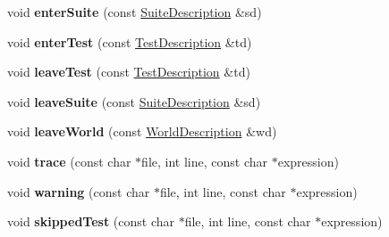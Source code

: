 \begin{DoxyCompactItemize}
\item 
\hypertarget{classCxxTest_1_1TestTracker_a777853f8a17e324fa7897bf4d7f3b105}{void {\bfseries enter\-Suite} (const \hyperlink{classCxxTest_1_1SuiteDescription}{Suite\-Description} \&sd)}\label{classCxxTest_1_1TestTracker_a777853f8a17e324fa7897bf4d7f3b105}

\item 
\hypertarget{classCxxTest_1_1TestTracker_a1bb56ae825eca66306259248716230a1}{void {\bfseries enter\-Test} (const \hyperlink{classCxxTest_1_1TestDescription}{Test\-Description} \&td)}\label{classCxxTest_1_1TestTracker_a1bb56ae825eca66306259248716230a1}

\item 
\hypertarget{classCxxTest_1_1TestTracker_ae7febc4e06e5140fac47d7ea1489ad86}{void {\bfseries leave\-Test} (const \hyperlink{classCxxTest_1_1TestDescription}{Test\-Description} \&td)}\label{classCxxTest_1_1TestTracker_ae7febc4e06e5140fac47d7ea1489ad86}

\item 
\hypertarget{classCxxTest_1_1TestTracker_ad99be8070c25bf86141e5312c4b561c1}{void {\bfseries leave\-Suite} (const \hyperlink{classCxxTest_1_1SuiteDescription}{Suite\-Description} \&sd)}\label{classCxxTest_1_1TestTracker_ad99be8070c25bf86141e5312c4b561c1}

\item 
\hypertarget{classCxxTest_1_1TestTracker_a1a726c2e92761ff8468724d9b331bd6b}{void {\bfseries leave\-World} (const \hyperlink{classCxxTest_1_1WorldDescription}{World\-Description} \&wd)}\label{classCxxTest_1_1TestTracker_a1a726c2e92761ff8468724d9b331bd6b}

\item 
\hypertarget{classCxxTest_1_1TestTracker_a8df89ee898716b2c13edd79fa197839a}{void {\bfseries trace} (const char $\ast$file, int line, const char $\ast$expression)}\label{classCxxTest_1_1TestTracker_a8df89ee898716b2c13edd79fa197839a}

\item 
\hypertarget{classCxxTest_1_1TestTracker_aeecca8cbd81e07370b30ba3016d26815}{void {\bfseries warning} (const char $\ast$file, int line, const char $\ast$expression)}\label{classCxxTest_1_1TestTracker_aeecca8cbd81e07370b30ba3016d26815}

\item 
\hypertarget{classCxxTest_1_1TestTracker_ae3858241d29b794cc0cb3d7231d77987}{void {\bfseries skipped\-Test} (const char $\ast$file, int line, const char $\ast$expression)}\label{classCxxTest_1_1TestTracker_ae3858241d29b794cc0cb3d7231d77987}


\end{DoxyCompactItemize}
